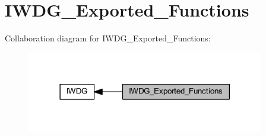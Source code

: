 \hypertarget{group___i_w_d_g___exported___functions}{}\section{I\+W\+D\+G\+\_\+\+Exported\+\_\+\+Functions}
\label{group___i_w_d_g___exported___functions}
Collaboration diagram for I\+W\+D\+G\+\_\+\+Exported\+\_\+\+Functions\+:
\nopagebreak
\begin{figure}[H]
\begin{center}
\leavevmode
\includegraphics[width=294pt]{group___i_w_d_g___exported___functions}
\end{center}
\end{figure}
